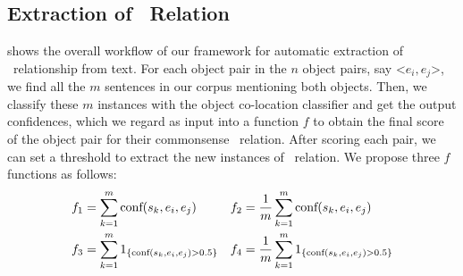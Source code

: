 %
%

\subsection{Extraction of \lnear\ Relation}
\label{sec:mine}
%
%

 shows the overall workflow of our framework for
automatic extraction of \lnear\ relationship from text. 
For each object pair in the $n$ object pairs, say \textless$e_i,e_j$\textgreater , 
we find all the $m$ sentences in our corpus mentioning both objects. 
Then, we classify these $m$ instances with the object
co-location classifier and get the output confidences, which we regard as input into a function $f$ to obtain the final score of the object pair for their commonsense \lnear\ relation. 
After scoring each pair, we can set a threshold to extract the new instances of \lnear\ relation.
We propose three $f$ functions as follows:
\begin{align*}
	f_1&=\sum_{k=1}^{m} \textnormal{conf}(s_k,e_i,e_j) & f_2&=\frac{1}{m}\sum_{k=1}^{m} \textnormal{conf}(s_k,e_i,e_j)\\
	f_3&=\sum_{k=1}^{m} 
	1_{ \{ \textnormal{conf}(s_k,e_i,e_j)>0.5 \} } &
	f_4&=\frac{1}{m}\sum_{k=1}^{m} 
	1_{ \{ \textnormal{conf}(s_k,e_i,e_j)>0.5 \} }
\end{align*}


